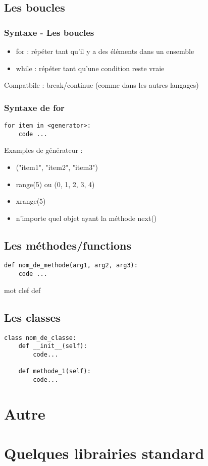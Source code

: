 \subsection{Les boucles}
\begin{frame}[fragile]
  \frametitle{Syntaxe - Les boucles}
  \begin{itemize}
  \item for : répéter tant qu'il y a des éléments dans un ensemble
  \item while : répéter tant qu'une condition reste vraie
  \end{itemize}

Compatbile : break/continue (comme dans les autres langages)
\end{frame}

\begin{frame}[fragile]
  \frametitle{Syntaxe de for}
  \begin{lstlisting}
for item in <generator>:
    code ...
  \end{lstlisting}
Examples de générateur :
  \begin{itemize}
  \item ("item1", "item2", "item3")
  \item range(5) ou (0, 1, 2, 3, 4)
  \item xrange(5)
  \item n'importe quel objet ayant la méthode next()
  \end{itemize}
\end{frame}

\subsection{Les méthodes/functions}
\begin{frame}[fragile]
  \begin{lstlisting}
def nom_de_methode(arg1, arg2, arg3):
    code ...
  \end{lstlisting}
  \begin{semiverbatim}
mot clef def
  \end{semiverbatim}
\end{frame}

\subsection{Les classes}
\begin{frame}[fragile]
  \begin{lstlisting}
class nom_de_classe:
    def __init__(self):
        code...

    def methode_1(self):
        code...
  \end{lstlisting}
\end{frame}

\section{Autre}

\section{Quelques librairies standard}
\begin{frame}[fragile]
\end{frame}
